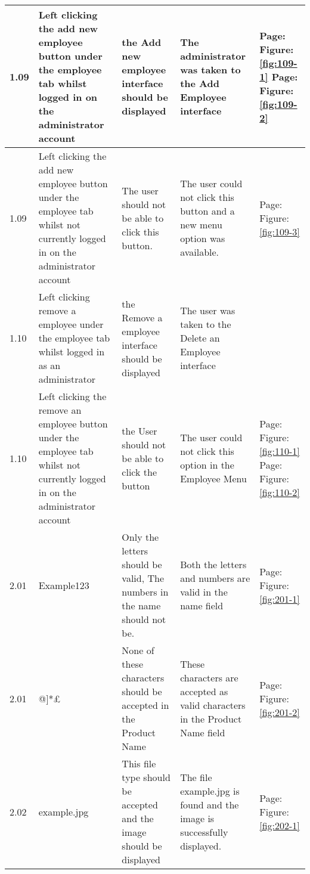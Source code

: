 \begin{flushleft}
\begin{longtable}{|p{1.0cm}|p{2.5cm}|p{3cm}|p{3.0cm}|p{2.5cm}|}
	1.09 & Left clicking the add new employee button under the employee tab whilst logged in on the administrator account &  the Add new employee interface should be displayed & The administrator was taken to the Add Employee interface &  Page:\pageref{fig:109-1}  \newline Figure:\ref{fig:109-1} \newline  \newline Page:\pageref{fig:109-2}  \newline Figure:\ref{fig:109-2}\\ \hline
	1.09 & Left clicking the add new employee button under the employee tab whilst not currently logged in on the administrator account & The user should not be able to click this button. & The user could not click this button and a new menu option was available. & Page:\pageref{fig:109-3}  \newline Figure:\ref{fig:109-3}\\ \hline
	1.10 & Left clicking remove a employee under the employee tab whilst logged in as an administrator & the Remove a employee interface should be displayed  & The user was taken to the Delete an Employee interface & \\ \hline
	1.10 & Left clicking the remove an employee button under the employee tab whilst not currently logged in on the administrator account & the User should not be able to click the button & The user could not click this option in the Employee Menu& Page:\pageref{fig:110-1}  \newline Figure:\ref{fig:110-1} \newline  \newline Page:\pageref{fig:110-2}  \newline Figure:\ref{fig:110-2}\\ \hline
	2.01 & Example123 & Only the letters should be valid, The numbers in the name should not be. & Both the letters and numbers are valid in the name field  & Page:\pageref{fig:201-1}  \newline Figure:\ref{fig:201-1}\\ \hline 
	2.01 &  @]*£  & None of these characters should be accepted in the Product Name & These characters are accepted as valid characters in the Product Name field& Page:\pageref{fig:201-2}  \newline Figure:\ref{fig:201-2}\\ \hline 
	2.02 & example.jpg & This file type should be accepted and the image should be displayed & The file example.jpg is found and the image is successfully displayed. & Page:\pageref{fig:202-1}  \newline Figure:\ref{fig:202-1} \\ \hline

\end{longtable}
\end{flushleft}
